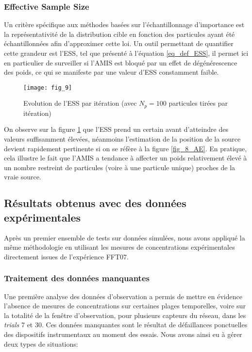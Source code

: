  \subsubsection{Effective Sample Size}
 
 Un critère spécifique aux méthodes basées sur l'échantillonnage d'importance est la représentativité de la distribution cible en fonction des particules ayant été échantillonnées afin d'approximer cette loi. Un outil permettant de quantifier cette grandeur est l'ESS, tel que présenté à l'équation \eqref{eq_def_ESS}, il permet ici en particulier de surveiller si l'AMIS est bloqué par un effet de dégénérescence des poids, ce qui se manifeste par une valeur d'ESS constamment faible. \\
 
 \begin{figure}[h!]
 	\centering
 	\texttt{[image: fig\_9]}
 	\caption{Evolution de l'ESS par itération (avec $N_p=100$ particules tirées par itération)}
 	\label{fig_9_AE}
 \end{figure}
 
 On observe sur la figure \ref{fig_9_AE} que l'ESS prend un certain  avant d'atteindre des valeurs suffisamment élevées, néanmoins l'estimation de la position de la source devient rapidement pertinente si on se réfère à la figure \ref{fig_8_AE}. En pratique, cela illustre le fait que l'AMIS a tendance à affecter un poids relativement élevé à un nombre restreint de particules (voire à une particule unique) proches de la vraie source. 
 
 
 \subsection{Résultats obtenus avec des données expérimentales}
 
 Après un premier ensemble de tests sur données simulées, nous avons appliqué la même méthodologie en utilisant les mesures de concentrations expérimentales directement issues de l'expérience FFT07. \\
 
 \subsubsection{Traitement des données manquantes}
 
 Une première analyse des données d'observation a permis de mettre en évidence l'absence de mesures de concentrations sur certaines plages temporelles, voire sur la totalité de la fenêtre d'observation, pour plusieurs capteurs du réseau, dans les \textit{trials} 7 et 30. Ces données manquantes sont le résultat de défaillances ponctuelles des dispositifs instrumentaux au moment des essais. Nous avons ainsi eu à gérer deux types de situations:
 
